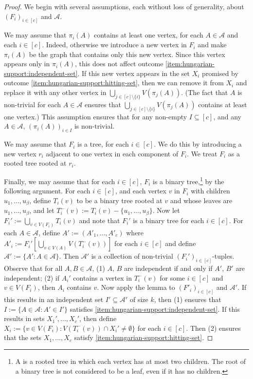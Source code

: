 \documentclass{patmorin}
\newcommand{\piotr}[1]{\textcolor{red}{Piotr: #1}}
\renewcommand{\mid}{:}  %
\begin{document}
\begin{proof}
We begin with several assumptions, each without loss of generality, about $(F_i)_{i\in[c]}$ and $\mathcal{A}$.

We may assume that $\pi_i(A)$ contains at least one vertex, for each $A\in\mathcal{A}$ and each $i\in[c]$.
Indeed, otherwise we introduce a new vertex in $F_i$ and make $\pi_i(A)$ be the graph that contains only this new vertex. Since this vertex appears only in $\pi_i(A)$, this does not affect outcome \cref{item:hungarian-support:independent-set}. If this new vertex appears in the set $X_i$ promised by outcome \cref{item:hungarian-support:hitting-set}, then we can remove it from $X_i$ and replace it with any other vertex in $\bigcup_{j\in[c]\setminus\{i\}}V(\pi_j(A))$.  (The fact that $A$ is non-trivial for each $A\in\mathcal{A}$ ensures that $\bigcup_{j\in[c]\setminus\{i\}}V(\pi_j(A))$ contains at least one vertex.)  This assumption ensures that for any non-empty $I\subseteq[c]$, and any $A\in\mathcal{A}$, $(\pi_i(A))_{i\in I}$ is non-trivial.

We may assume that $F_i$ is a tree, for each $i\in[c]$.  We do this by introducing a new vertex $r_i$ adjacent to one vertex in each component of $F_i$.  We treat $F_i$ as a rooted tree rooted at $r_i$.  

Finally, we may assume that for each $i\in[c]$, $F_i$ is a binary tree,\footnote{A  is a rooted tree in which each vertex has at most two children. The root of a binary tree is not considered to be a leaf, even if it has no children.} by the following argument.
For each $i\in[c]$, and each vertex $v$ in $F_i$ with children $u_1,\ldots,u_\beta$, define $T_i(v)$ to be a binary tree rooted at $v$ and whose leaves are $u_1,\ldots,u_\beta$, and let $T^-_i(v):=T_i(v)-\{u_1,\ldots,u_\beta\}$.  
Now let $F_i':=\bigcup_{v\in V(F_i)} T_i(v)$ and note that $F_i'$ is a binary tree for each $i\in[c]$.  
For each $A\in\mathcal{A}$, define $A':=(A'_1,\ldots,A'_c)$ where $A'_i:=F_i'[\bigcup_{v\in V(A)} V(T^-_i(v))]$ for each $i\in [c]$ and define $\mathcal{A}':=\{A'\mid A\in\mathcal{A}\}$.  Then $\mathcal{A}'$ is a collection of non-trivial $(F_i')_{i\in[c]}$-tuples. Observe that for all $A,B\in\mathcal{A}$,
(1) $A$, $B$ are independent if and only if $A'$, $B'$ are independent;
(2) if $A_i'$ contains a vertex in $T_i^-(v)$ for some $i\in[c]$ and $v\in V(F_i)$, then $A_i$ contains $v$.  Now apply the lemma to $(F'_i)_{i\in[c]}$ and $\mathcal{A}'$.  If this results in an independent set $I'\subseteq\mathcal{A}'$ of size $k$, then (1) ensures that $I:=\{A\in\mathcal{A}\mid A'\in I'\}$ satisfies \cref{item:hungarian-support:independent-set}.  If this results in sets $X_1',\ldots,X_c'$, then define $X_i:=\{v\in V(F_i)\mid V(T_i^-(v))\cap X_i'\neq\emptyset\}$ for each $i\in[c]$.  Then (2) ensures that the sets $X_1,\ldots,X_c$ satisfy \cref{item:hungarian-support:hitting-set}. 



\end{proof}
\end{document}
